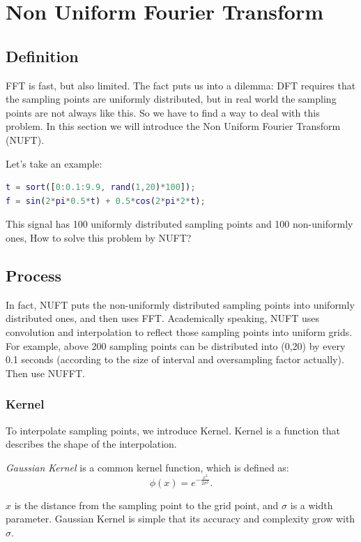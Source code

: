\documentclass[10pt,a4paper,oneside,numbers=noenddot]{scrbook}
\theoremstyle{ctplain}
\theoremstyle{ctresult}
\begin{document}
\section{Non Uniform Fourier Transform}

\subsection{Definition}

FFT is fast, but also limited. The fact puts us into a dilemma: DFT requires that the
sampling points are uniformly distributed, but in real world the sampling points are not
always like this. So we have to find a way to deal with this problem. In this section we
will introduce the Non Uniform Fourier Transform (NUFT).

Let's take an example:

\begin{lstlisting}[language=Matlab]
t = sort([0:0.1:9.9, rand(1,20)*100]);
f = sin(2*pi*0.5*t) + 0.5*cos(2*pi*2*t);
\end{lstlisting}

This signal has 100 uniformly distributed sampling points and 100 non-uniformly ones,
How to solve this problem by NUFT?

\subsection{Process}

In fact, NUFT puts the non-uniformly distributed sampling points into uniformly
distributed ones, and then uses FFT. Academically speaking, NUFT uses convolution and
interpolation to reflect those sampling points into uniform grids. For example, above
200 sampling points can be distributed into (0,20) by every 0.1 seconds (according to
the size of interval and oversampling factor actually). Then use NUFFT.

\subsubsection{Kernel}
To interpolate sampling points, we introduce Kernel. Kernel is a function that
describes the shape of the interpolation.

\emph{Gaussian Kernel} is a common kernel function, which is defined as:
\[
  \phi(x) = e^{-\frac{x^2}{2\sigma^2}}.
\]

$x$ is the distance from the sampling point to the grid point, and $\sigma$ is a width
parameter. Gaussian Kernel is simple that its accuracy and complexity grow with $\sigma$.
\end{document}
